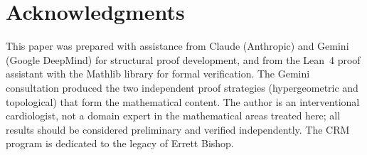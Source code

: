 \documentclass[11pt]{article}
\theoremstyle{plain}
\theoremstyle{definition}
\theoremstyle{remark}
\begin{document}
\section*{Acknowledgments}

This paper was prepared with assistance from Claude (Anthropic) and
Gemini (Google DeepMind) for structural proof development, and from
the Lean~4 proof assistant with the Mathlib library \cite{mathlib}
for formal verification.
The Gemini consultation produced the two independent proof strategies
(hypergeometric and topological) that form the mathematical content.
The author is an interventional cardiologist, not a domain expert
in the mathematical areas treated here; all results should be
considered preliminary and verified independently.
The CRM program is dedicated to the legacy of Errett Bishop.


\end{document}
